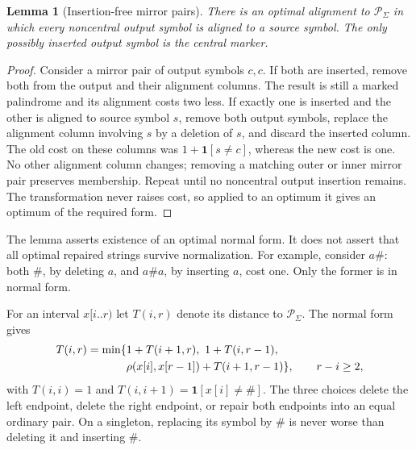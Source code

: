 \documentclass[sigconf,screen]{acmart}
\newcommand{\Pal}{\mathcal P}
\newcommand{\ind}[1]{\mathbf 1[#1]}
\newtheorem{lemma}[theorem]{Lemma}
\theoremstyle{definition}
\begin{document}
\begin{lemma}[Insertion-free mirror pairs]\label{lem:normal}
There is an optimal alignment to $\Pal_\Sigma$ in which every noncentral output symbol is aligned to a source symbol. The only possibly inserted output symbol is the central marker.
\end{lemma}
\begin{proof}
Consider a mirror pair of output symbols $c,c$. If both are inserted, remove both from the output and their alignment columns. The result is still a marked palindrome and its alignment costs two less. If exactly one is inserted and the other is aligned to source symbol $s$, remove both output symbols, replace the alignment column involving $s$ by a deletion of $s$, and discard the inserted column. The old cost on these columns was $1+\ind{s\ne c}$, whereas the new cost is one. No other alignment column changes; removing a matching outer or inner mirror pair preserves membership. Repeat until no noncentral output insertion remains. The transformation never raises cost, so applied to an optimum it gives an optimum of the required form.
\end{proof}

The lemma asserts existence of an optimal normal form. It does not assert that all optimal repaired strings survive normalization. For example, consider $a\#$: both $\#$, by deleting $a$, and $a\#a$, by inserting $a$, cost one. Only the former is in normal form.

For an interval $x[i..r)$ let $T(i,r)$ denote its distance to $\Pal_\Sigma$. The normal form gives
\begin{align}\label{eq:interval}
T(i,r)=\min\{&1+T(i+1,r),\ 1+T(i,r-1),\notag\\
             &\rho(x[i],x[r-1])+T(i+1,r-1)\},\qquad r-i\ge2,
\end{align}
with $T(i,i)=1$ and $T(i,i+1)=\ind{x[i]\ne\#}$. The three choices delete the left endpoint, delete the right endpoint, or repair both endpoints into an equal ordinary pair. On a singleton, replacing its symbol by $\#$ is never worse than deleting it and inserting $\#$.
\end{document}
